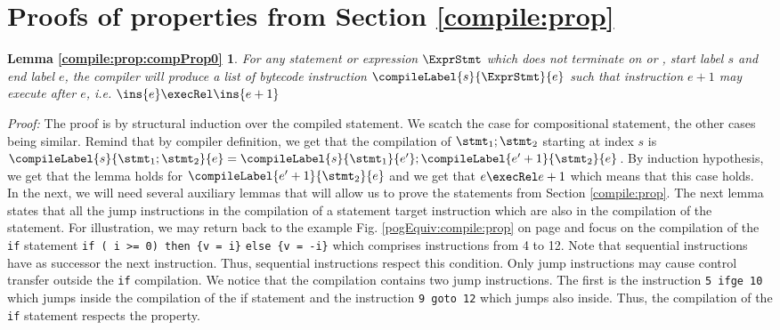 \newtheorem{compPropApp}{Lemma}[section]

\newtheorem*{compProp0A}{Lemma  \ref{compile:prop:compProp0}}
\newtheorem*{compProp3A}{Lemma  \ref{compile:prop:compProp3}}
\newtheorem*{compProp8A}{Lemma  \ref{compile:prop:compProp8}}
\newtheorem*{compProp9A}{Lemma  \ref{compile:prop:compProp4}}

\section{Proofs of properties from Section \ref{compile:prop} }\label{appendix:compile:prop}


\begin{compProp0A}%
 For any statement or expression $\ExprStmt$ which does not terminate on \return{} or \athrow, start label $s$ and end label $e$,
    the compiler will produce a list of bytecode instruction $\compileLabel{s}{\ExprStmt}{e}$ such that  instruction  $e+1$ may execute after
    $e$, i.e.   $ \ins{e} \execRel \ins{e+1}$
\end{compProp0A}
\textit{Proof:} 
The proof  is by structural induction over the compiled statement.
We scatch the case for compositional statement, the other cases being similar. 
Remind that by compiler definition, we get that the compilation of $\stmt_1; \stmt_2$ starting at index $s$ is
 $\compileLabel{s}{\stmt_1; \stmt_2}{e} = \compileLabel{s}{\stmt_1}{e'};\compileLabel{e'+1}{\stmt_2}{e}$.
By  induction hypothesis, we get that the lemma holds for $\compileLabel{e'+1}{\stmt_2}{e}$ and we get that $e \execRel e+1$ 
which means that this case holds.
\Qed \\


In the next, we will need several auxiliary lemmas that will allow us to prove the statements from Section \ref{compile:prop}. 
The next lemma states that all the jump instructions in the compilation of a statement target instruction which are also 
in the compilation of the statement.
For illustration, we may return back to the example Fig. \ref{pogEquiv:compile:prop}  on page \pageref{pogEquiv:compile:prop} and focus on the 
compilation of the \lstinline!if!  statement   
\lstinline!if ( i >= 0) then {v = i}! \lstinline!else {v = -i}! 
which comprises instructions from 4 to 12. Note that sequential instructions   have as  successor the next instruction.  Thus, sequential
instructions respect this condition. 
Only jump instructions may cause control transfer outside the \lstinline!if! compilation. 
We notice that the compilation contains two jump instructions. 
The first is the instruction \lstinline!5 ifge 10! which jumps inside the compilation of the if statement
and the instruction \lstinline!9 goto 12!  which jumps also inside.
Thus, the compilation of the \lstinline!if! statement respects the property.


